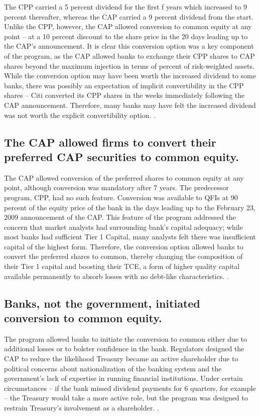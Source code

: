 \documentclass[12pt]{article}
\begin{document}
The CPP carried a 5 percent dividend for the first f years which increased to 9 percent thereafter, whereas the CAP carried a 9 percent dividend from the start. Unlike the CPP, however, the CAP allowed conversion to common equity at any point -- at a 10 percent discount to the share price in the 20 days leading up to the CAP's announcement. It is clear this conversion option was a key component of the program, as the CAP allowed banks to exchange their CPP shares to CAP shares beyond the maximum injection in terms of percent of risk-weighted assets. While the conversion option may have been worth the increased dividend to some banks, there was possibly an expectation of implicit convertibility in the CPP shares -- Citi converted its CPP shares in the weeks immediately following the CAP announcement. Therefore, many banks may have felt the increased dividend was not worth the explicit convertibility option. \citep{GW}.

\subsection{The CAP allowed firms to convert their preferred CAP securities to common equity.}

The CAP allowed conversion of the preferred shares to common equity at any point, although conversion was mandatory after 7 years. The predecessor program, CPP, had no such feature. Conversion was available to QFIs at 90 percent of the equity price of the bank in the days leading up to the February 23, 2009 announcement of the CAP. This feature of the program addressed the concern that market analysts had surrounding bank's capital adequacy; while most banks had sufficient Tier 1 Capital, many analysts felt there was insufficient capital of the highest form. Therefore, the conversion option allowed banks to convert the preferred shares to common, thereby changing the composition of their Tier 1 capital and boosting their TCE, a form of higher quality capital available permanently to absorb losses with no debt-like characteristics. \citep{WhitePaper}. 

\subsection{Banks, not the government, initiated conversion to common equity.}

The program allowed banks to initiate the conversion to common either due to additional losses or to bolster confidence in the bank. Regulators designed the CAP to reduce the likelihood Treasury became an active shareholder due to political concerns about nationalization of the banking system and the government's lack of expertise in running financial institutions. Under certain circumstances -- if the bank missed dividend payments for 6 quarters, for example -- the Treasury would take a more active role, but the program was designed to restrain Treasury's involvement as a shareholder. \citep{GW}.
\end{document}
